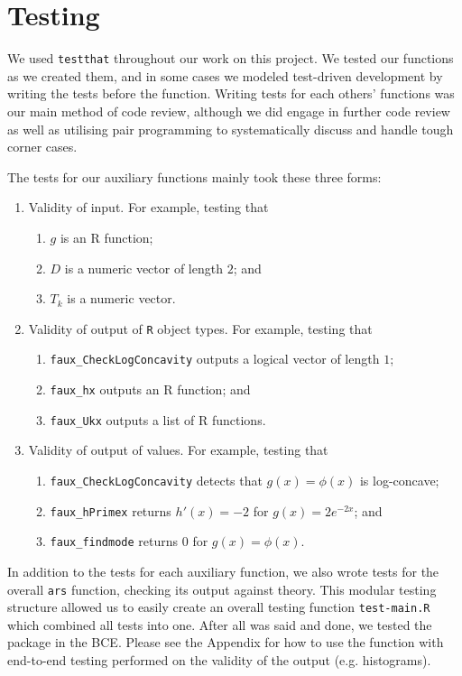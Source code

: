 \documentclass{article}\usepackage[]{graphicx}\usepackage[]{color}
\begin{document}
\section{Testing}

We used \texttt{testthat} throughout our work on this project.
We tested our functions as we created them, and in some cases we modeled
test-driven development by writing the tests before the function.
Writing tests for each others' functions was our main method of code review,
although we did engage in further code review as well as utilising pair programming
to systematically discuss and handle tough corner cases.

The tests for our auxiliary functions mainly took these three forms:
\begin{enumerate}
	\item Validity of input. For example, testing that
	\begin{enumerate}
		\item $g$ is an R function;
		\item $D$ is a numeric vector of length $2$; and
		\item $T_k$ is a numeric vector.
	\end{enumerate}
	\item Validity of output of \texttt{R} object types. For example, testing that
	\begin{enumerate}
		\item \texttt{faux\_CheckLogConcavity} outputs a logical vector of length $1$;
		\item \texttt{faux\_hx} outputs an R function; and
		\item \texttt{faux\_Ukx} outputs a list of R functions.
	\end{enumerate}
	\item Validity of output of values. For example, testing that
	\begin{enumerate}
		\item \texttt{faux\_CheckLogConcavity} detects that $g(x) = \phi(x)$
		is log-concave;
		\item \texttt{faux\_hPrimex} returns $h'(x) = - 2$ for $g(x) = 2e^{-2x}$; and
		\item \texttt{faux\_findmode} returns $0$ for $g(x) = \phi(x)$.
	\end{enumerate}
\end{enumerate}
In addition to the tests for each auxiliary function, we also wrote tests
for the overall \texttt{ars} function, checking its output against theory.
This modular testing structure allowed us to easily create an overall testing
function \texttt{test-main.R} which combined all tests into one.
After all was said and done, we tested the package in the BCE. Please see the 
Appendix for how to use the function with end-to-end testing performed on the 
validity of the output (e.g. histograms).
\end{document}
